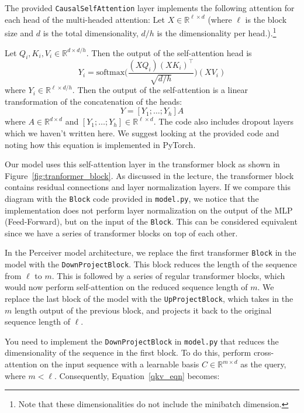 \begin{parts}
The provided \texttt{CausalSelfAttention} layer implements the following attention for each head of the multi-headed attention: Let $X\in \mathbb{R}^{\ell \times d}$ (where $\ell$ is the block size and $d$ is the total dimensionality, $d/h$ is the dimensionality per head.).\footnote{Note that these dimensionalities do not include the minibatch dimension.}

Let $Q_i,K_i,V_i \in \mathbb{R}^{d\times d/h}$.
Then the output of the self-attention head is 
\begin{equation} \label{qkv_eqn}
Y_i = \text{softmax}\bigg(\frac{(XQ_i)(XK_i)^\top}{\sqrt{d/h}}\bigg)(XV_i)
\end{equation}
where $Y_i\in\mathbb{R}^{\ell \times d/h}$.
Then the output of the self-attention is a linear transformation of the concatenation of the heads:
\begin{equation}
Y = [Y_1;\dots;Y_h]A
\end{equation}
where $A \in\mathbb{R}^{d\times d}$ and $[Y_1;\dots;Y_h]\in\mathbb{R}^{\ell \times d}$.
The code also includes dropout layers which we haven't written here.
We suggest looking at the provided code and noting how this equation is implemented in PyTorch.

Our model uses this self-attention layer in the transformer block as shown in Figure~\ref{fig:tranformer_block}. As discussed in the lecture, the transformer block contains residual connections and layer normalization layers. If we compare this diagram with the \texttt{Block} code provided in \texttt{model.py}, we notice that the implementation does not perform layer normalization on the output of the MLP (Feed-Forward), but on the input of the \texttt{Block}. This can be considered equivalent since we have a series of transformer blocks on top of each other. 

In the Perceiver model architecture, we replace the first transformer \texttt{Block} in the model with the \texttt{DownProjectBlock}. This block reduces the length of the sequence from $\ell$ to $m$. This is followed by a series of regular transformer blocks, which would now perform self-attention on the reduced sequence length of $m$. We replace the last block of the model with the \texttt{UpProjectBlock}, which takes in the $m$ length output of the previous block, and projects it back to the original sequence length of $\ell$.

You need to implement the \texttt{DownProjectBlock} in \texttt{model.py} that reduces the dimensionality of the sequence in the first block. To do this, perform cross-attention on the input sequence with a learnable basis $C \in \mathbb{R}^{m \times d}$ as the query, where $m < \ell$. Consequently, Equation~\ref{qkv_eqn} becomes: 


\end{parts}
